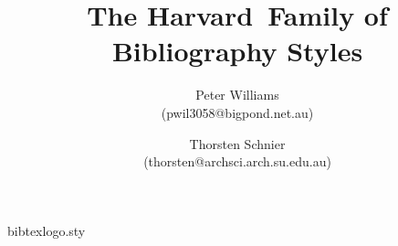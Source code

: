%
%
% 
%
%
\begin{filecontents}{bibtexlogo.sty}
\def\lowBibTeX{{\reset@font\rmfamily B\kern-.05em%
    \raise.0ex\hbox{\scshape i\kern-.025em b}\kern-.08em%
    T\kern-.1667em\lower.7ex\hbox{E}\kern-.125emX}}
\def\BibTeX{\protect\lowBibTeX}
\end{filecontents}
\documentclass[a4paper]{article}
\usepackage{harvard}
\usepackage{bibtexlogo}

\newcommand{\comname}[1]{{\bf $\backslash$#1}}
\newcommand{\keyword}[1]{{\bf #1}}
\newcommand{\varname}[1]{{\em #1}}
\newcommand{\harvard}{{\sf harvard}}
\newcommand{\Harvard}{{\sf Harvard}}

\title{The \Harvard\ Family of Bibliography Styles}
\author{Peter Williams \\ (pwil3058@bigpond.net.au) \and
Thorsten Schnier \\ (thorsten@archsci.arch.su.edu.au)}




\maketitle
\tableofcontents

\section{Introduction}

This document describes the \harvard\ family of bibliographic styles which
are provided in addition to those described in  and .
This style is primarily intended for use with the \BibTeX\ bibliographic
database management system.
However, provision is also made for hand coding of bibliographies.

